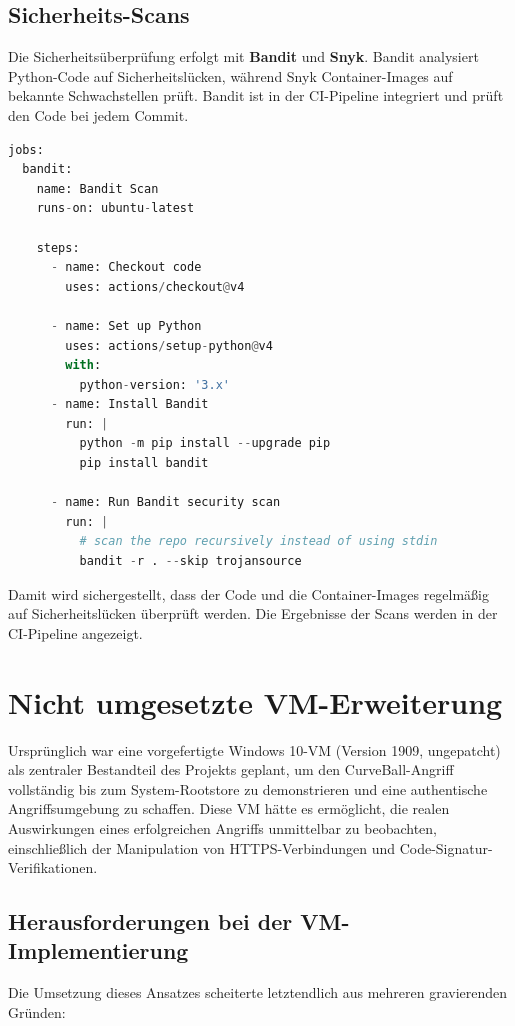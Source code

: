 \documentclass{article}
\begin{document}
\newpage

\subsection{Sicherheits-Scans}
Die Sicherheitsüberprüfung erfolgt mit \textbf{Bandit} und \textbf{Snyk}.
Bandit analysiert Python-Code auf Sicherheitslücken, während Snyk Container-Images auf bekannte Schwachstellen prüft.
Bandit ist in der CI-Pipeline integriert und prüft den Code bei jedem Commit.

\begin{lstlisting}[language=python,caption={bandit workflow file}]
jobs:
  bandit:
    name: Bandit Scan
    runs-on: ubuntu-latest

    steps:
      - name: Checkout code
        uses: actions/checkout@v4

      - name: Set up Python
        uses: actions/setup-python@v4
        with:
          python-version: '3.x'
      - name: Install Bandit
        run: |
          python -m pip install --upgrade pip
          pip install bandit

      - name: Run Bandit security scan
        run: |
          # scan the repo recursively instead of using stdin
          bandit -r . --skip trojansource
\end{lstlisting}

\noindent
Damit wird sichergestellt, dass der Code und die Container-Images regelmäßig auf Sicherheitslücken
überprüft werden. Die Ergebnisse der Scans werden in der CI-Pipeline angezeigt.

\newpage


\section{Nicht umgesetzte VM-Erweiterung}
Ursprünglich war eine vorgefertigte Windows 10-VM (Version 1909, ungepatcht) als zentraler Bestandteil des Projekts geplant,
um den CurveBall-Angriff vollständig bis zum System-Rootstore zu demonstrieren und eine authentische Angriffsumgebung zu schaffen.
Diese VM hätte es ermöglicht, die realen Auswirkungen eines erfolgreichen Angriffs unmittelbar zu beobachten, einschließlich der
Manipulation von HTTPS-Verbindungen und Code-Signatur-Verifikationen.

\subsection{Herausforderungen bei der VM-Implementierung}
Die Umsetzung dieses Ansatzes scheiterte letztendlich aus mehreren gravierenden Gründen:
\end{document}
